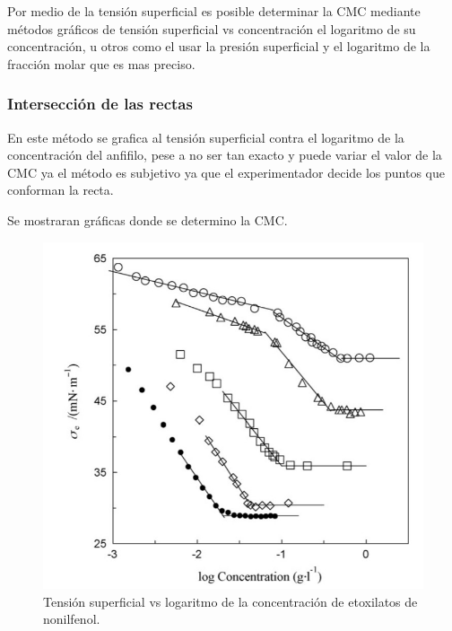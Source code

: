 \documentclass[10pt]{report}
\begin{document}
    Por medio de la tensión superficial es posible determinar la CMC mediante métodos gráficos de tensión superficial vs concentración el logaritmo de su concentración, u otros como el usar la presión superficial y el logaritmo de la fracción molar que es mas preciso.

    \subsubsection*{Intersección de las rectas}

    En este método se grafica al tensión superficial contra el logaritmo de la concentración del anfifilo, pese a no ser tan exacto y puede variar el valor de la CMC ya el método es subjetivo ya que el experimentador decide los puntos que conforman la recta.

    Se mostraran gráficas donde se determino la CMC.

    \begin{figure}[h!]
        \centering
        \includegraphics[scale=0.5]{./log1.jpg}
        \caption{Tensión superficial vs logaritmo de la concentración de etoxilatos de nonilfenol.\cite{art:log1}}
    \end{figure}
\end{document}

